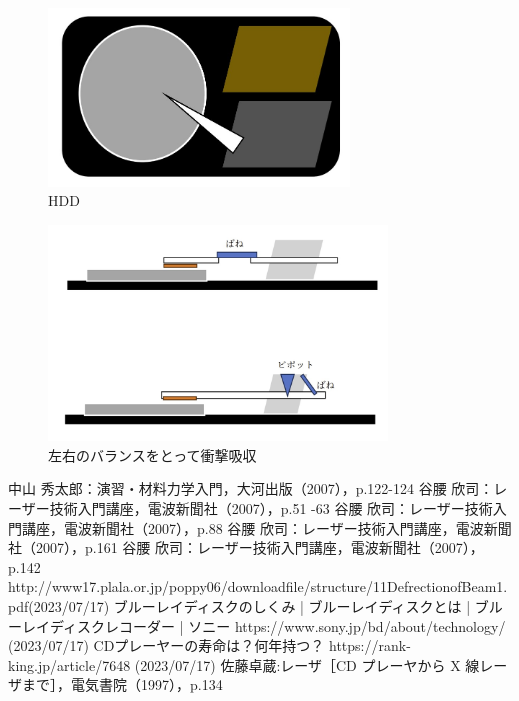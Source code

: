 \documentclass[a4paper,12pt]{jsarticle}
\begin{document}
\begin{enumerate}
\begin{figure}[h]
  \centering
  \includegraphics[width=8cm]{10.jpg}
  \caption{HDD}
\end{figure}
\begin{figure}[h]
  \centering
  \includegraphics[width=9cm]{11.jpg}
  \caption{左右のバランスをとって衝撃吸収}
\end{figure}
\end{enumerate}

\begin{thebibliography}{20}
  \bibitem{} 
  中山 秀太郎：演習・材料力学入門，大河出版（2007），p.122-124
  \bibitem{} 
  谷腰 欣司：レーザー技術入門講座，電波新聞社（2007），p.51 -63
  \bibitem{}
  谷腰 欣司：レーザー技術入門講座，電波新聞社（2007），p.88
  \bibitem{}
  谷腰 欣司：レーザー技術入門講座，電波新聞社（2007），p.161
  \bibitem{}
  谷腰 欣司：レーザー技術入門講座，電波新聞社（2007），p.142
  \bibitem{}
  http://www17.plala.or.jp/poppy06/downloadfile/structure/11DefrectionofBeam1.pdf(2023/07/17)
  \bibitem{} 
  ブルーレイディスクのしくみ | ブルーレイディスクとは | ブルーレイディスクレコーダー | ソニー https://www.sony.jp/bd/about/technology/ (2023/07/17)
  \bibitem{} 
  CDプレーヤーの寿命は？何年持つ？ https://rank-king.jp/article/7648 (2023/07/17)
  \bibitem{}
  佐藤卓蔵:レーザ［CD プレーヤから X 線レーザまで］，電気書院（1997），p.134
  \end{thebibliography}
\end{document}
